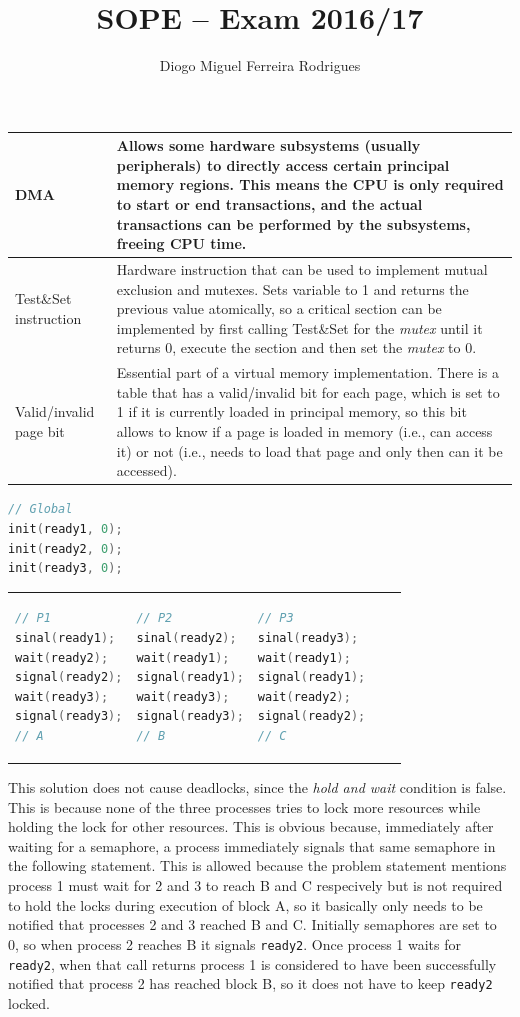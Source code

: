 \documentclass{sope}
\title{SOPE -- Exam 2016/17}
\author{Diogo Miguel Ferreira Rodrigues \\ \email{dmfrodrigues2000@gmail.com}}
\begin{document}
\setcounter{chapter}{16}
\begin{tabular}{p{29mm} | p{122mm}}
    DMA & Allows some hardware subsystems (usually peripherals) to directly access certain principal memory regions. This means the CPU is only required to start or end transactions, and the actual transactions can be performed by the subsystems, freeing CPU time. \\ \hline
    Test\&Set instruction & Hardware instruction that can be used to implement mutual exclusion and mutexes. Sets variable to 1 and returns the previous value atomically, so a critical section can be implemented by first calling Test\&Set for the \emph{mutex} until it returns 0, execute the section and then set the \emph{mutex} to 0. \\ \hline
    Valid/invalid page bit & Essential part of a virtual memory implementation. There is a table that has a valid/invalid bit for each page, which is set to 1 if it is currently loaded in principal memory, so this bit allows to know if a page is loaded in memory (i.e., can access it) or not (i.e., needs to load that page and only then can it be accessed).
\end{tabular}

\begin{lstlisting}[language=C]
// Global
init(ready1, 0);
init(ready2, 0);
init(ready3, 0);
\end{lstlisting}
\begin{tabular}{p{49mm} p{49mm} p{49mm}}
    \begin{lstlisting}[language=C]
// P1
sinal(ready1);
wait(ready2);
signal(ready2);
wait(ready3);
signal(ready3);
// A    
    \end{lstlisting} &
    \begin{lstlisting}[language=C]
// P2
sinal(ready2);
wait(ready1);
signal(ready1);
wait(ready3);
signal(ready3);
// B    
    \end{lstlisting} &
    \begin{lstlisting}[language=C]
// P3
sinal(ready3);
wait(ready1);
signal(ready1);
wait(ready2);
signal(ready2);    
// C
    \end{lstlisting}
\end{tabular}

This solution does not cause deadlocks, since the \emph{hold and wait} condition is false. This is because none of the three processes tries to lock more resources while holding the lock for other resources. This is obvious because, immediately after waiting for a semaphore, a process immediately signals that same semaphore in the following statement. This is allowed because the problem statement mentions process 1 must wait for 2 and 3 to reach B and C respecively but is not required to hold the locks during execution of block A, so it basically only needs to be notified that processes 2 and 3 reached B and C. Initially semaphores are set to 0, so when process 2 reaches B it signals \texttt{ready2}. Once process 1 waits for \texttt{ready2}, when that call returns process 1 is considered to have been successfully notified that process 2 has reached block B, so it does not have to keep \texttt{ready2} locked.
\end{document}
